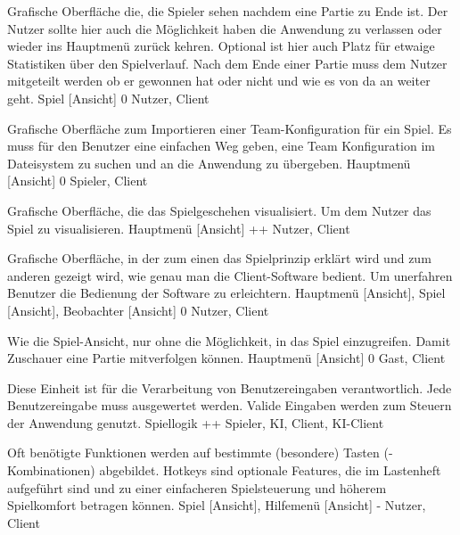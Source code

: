         {Grafische Oberfläche die, die Spieler sehen nachdem eine Partie zu Ende ist. Der Nutzer sollte hier auch die Möglichkeit haben die Anwendung zu verlassen oder wieder ins Hauptmenü zurück kehren. Optional ist hier auch Platz für etwaige Statistiken über den Spielverlauf.}
        {Nach dem Ende einer Partie muss dem Nutzer mitgeteilt werden ob er gewonnen hat oder nicht und wie es von da an weiter geht. }
        {Spiel [Ansicht]}
        {0}
        {Nutzer, Client}
        
        {Grafische Oberfläche zum Importieren einer Team-Konfiguration für ein Spiel.}
        {Es muss für den Benutzer eine einfachen Weg geben, eine Team Konfiguration im Dateisystem zu suchen und an die Anwendung zu übergeben.}
        {Hauptmenü [Ansicht]}
        {0}
        {Spieler, Client}
        
        {Grafische Oberfläche, die das Spielgeschehen visualisiert.}
        {Um dem Nutzer das Spiel zu visualisieren.}
        {Hauptmenü [Ansicht]}
        {++}
        {Nutzer, Client}	
        
        {Grafische Oberfläche, in der zum einen das Spielprinzip erklärt wird und zum anderen gezeigt wird, wie genau man die Client-Software bedient.}
        {Um unerfahren Benutzer die Bedienung der Software zu erleichtern.}
        {Hauptmenü [Ansicht], Spiel [Ansicht], Beobachter [Ansicht]}
        {0}
        {Nutzer, Client}
        
        {Wie die Spiel-Ansicht, nur ohne die Möglichkeit, in das Spiel einzugreifen.}
        {Damit Zuschauer eine Partie mitverfolgen können.}
        {Hauptmenü [Ansicht]}
        {0}
        {Gast, Client}

        {Diese Einheit ist für die Verarbeitung von Benutzereingaben verantwortlich.}
        {Jede Benutzereingabe muss ausgewertet werden. Valide Eingaben werden zum Steuern der Anwendung genutzt.}
        {Spiellogik}
        {++}
        {Spieler, KI, Client, KI-Client}
        
        {Oft benötigte Funktionen werden auf bestimmte (besondere) Tasten (-Kombinationen) abgebildet.}
        {Hotkeys sind optionale Features, die im Lastenheft aufgeführt sind und zu einer einfacheren Spielsteuerung und höherem Spielkomfort betragen können.}
        {Spiel [Ansicht], Hilfemenü [Ansicht]}
        {-}
        {Nutzer, Client}
        
